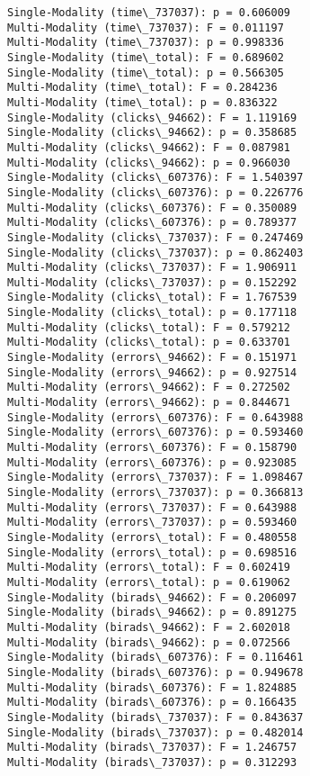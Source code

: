 \documentclass[11pt]{article}
\begin{document}
\begin{Verbatim}[commandchars=\\\{\}]
Single-Modality (time\_737037): p = 0.606009
Multi-Modality (time\_737037): F = 0.011197
Multi-Modality (time\_737037): p = 0.998336
Single-Modality (time\_total): F = 0.689602
Single-Modality (time\_total): p = 0.566305
Multi-Modality (time\_total): F = 0.284236
Multi-Modality (time\_total): p = 0.836322
Single-Modality (clicks\_94662): F = 1.119169
Single-Modality (clicks\_94662): p = 0.358685
Multi-Modality (clicks\_94662): F = 0.087981
Multi-Modality (clicks\_94662): p = 0.966030
Single-Modality (clicks\_607376): F = 1.540397
Single-Modality (clicks\_607376): p = 0.226776
Multi-Modality (clicks\_607376): F = 0.350089
Multi-Modality (clicks\_607376): p = 0.789377
Single-Modality (clicks\_737037): F = 0.247469
Single-Modality (clicks\_737037): p = 0.862403
Multi-Modality (clicks\_737037): F = 1.906911
Multi-Modality (clicks\_737037): p = 0.152292
Single-Modality (clicks\_total): F = 1.767539
Single-Modality (clicks\_total): p = 0.177118
Multi-Modality (clicks\_total): F = 0.579212
Multi-Modality (clicks\_total): p = 0.633701
Single-Modality (errors\_94662): F = 0.151971
Single-Modality (errors\_94662): p = 0.927514
Multi-Modality (errors\_94662): F = 0.272502
Multi-Modality (errors\_94662): p = 0.844671
Single-Modality (errors\_607376): F = 0.643988
Single-Modality (errors\_607376): p = 0.593460
Multi-Modality (errors\_607376): F = 0.158790
Multi-Modality (errors\_607376): p = 0.923085
Single-Modality (errors\_737037): F = 1.098467
Single-Modality (errors\_737037): p = 0.366813
Multi-Modality (errors\_737037): F = 0.643988
Multi-Modality (errors\_737037): p = 0.593460
Single-Modality (errors\_total): F = 0.480558
Single-Modality (errors\_total): p = 0.698516
Multi-Modality (errors\_total): F = 0.602419
Multi-Modality (errors\_total): p = 0.619062
Single-Modality (birads\_94662): F = 0.206097
Single-Modality (birads\_94662): p = 0.891275
Multi-Modality (birads\_94662): F = 2.602018
Multi-Modality (birads\_94662): p = 0.072566
Single-Modality (birads\_607376): F = 0.116461
Single-Modality (birads\_607376): p = 0.949678
Multi-Modality (birads\_607376): F = 1.824885
Multi-Modality (birads\_607376): p = 0.166435
Single-Modality (birads\_737037): F = 0.843637
Single-Modality (birads\_737037): p = 0.482014
Multi-Modality (birads\_737037): F = 1.246757
Multi-Modality (birads\_737037): p = 0.312293

    \end{Verbatim}

    \begin{center}
    \end{center}
    { \hspace*{\fill} \\}
    
\end{document}
